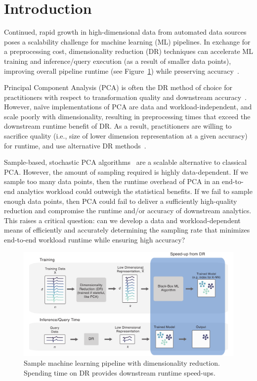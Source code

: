 
\section{Introduction}
\label{sec:intro}

Continued, rapid growth in high-dimensional data from automated data sources~\cite{plato,macrobase-cidr} poses a scalability challenge for machine learning (ML) pipelines.
In exchange for a preprocessing cost, dimensionality reduction (DR) techniques can accelerate ML training and inference/query execution (as a result of smaller data points), improving overall pipeline runtime (see Figure~\ref{fig:pipeline}) while preserving accuracy~\cite{keogh-indexing,local-dr,decade,gemini}.

Principal Component Analysis (PCA) is often the DR method of choice for practitioners with respect to transformation quality and downstream accuracy~\cite{jolbook}. However, na\"{i}ve implementations of PCA are data and workload-independent, and scale poorly with dimensionality, resulting in preprocessing times that exceed the downstream runtime benefit of DR. As a result, practitioners are willing to sacrifice quality (i.e., size of lower dimension representation at a given accuracy) for runtime, and use alternative DR methods~\cite{keogh-study}. 


Sample-based, stochastic PCA algorithms~\cite{shamir,re-new} are a scalable alternative to classical PCA.
However, the amount of sampling required is highly data-dependent.
If we sample too many data points, then the runtime overhead of PCA in an end-to-end analytics workload could outweigh the statistical benefits.
If we fail to sample enough data points, then PCA could fail to deliver a sufficiently high-quality reduction and compromise the runtime and/or accuracy of downstream analytics.
This raises a critical question: can we develop a data and workload-dependent means of efficiently and accurately determining the sampling rate that minimizes end-to-end workload runtime while ensuring high accuracy?

\begin{figure}
\includegraphics[width=\linewidth]{figs/pipeline.pdf}
\caption[]{Sample machine learning pipeline with dimensionality reduction. Spending time on DR provides downstream runtime speed-ups.}
\label{fig:pipeline}
\end{figure}


